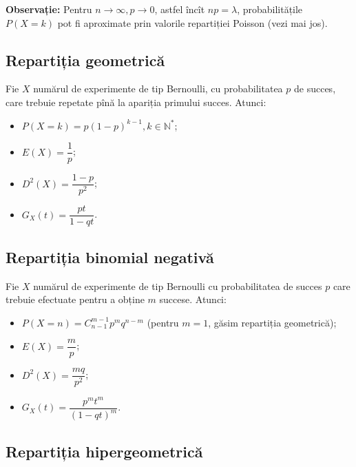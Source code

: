 \documentclass[12pt,a4paper]{article}
\newcommand\NN{\mathbb{N}}
\theoremstyle{dotless}
\theoremstyle{dotlessdr}
\begin{document}
\textbf{Observație:} Pentru $ n \to \infty, p \to 0 $, astfel încît $ np = \lambda $,
probabilitățile $ P(X = k) $ pot fi aproximate prin valorile repartiției Poisson
(vezi mai jos).


\subsection*{Repartiția geometrică}

\indent\indent Fie $ X $ numărul de experimente de tip Bernoulli, cu probabilitatea $ p $
de succes, care trebuie repetate pînă la apariția primului succes. Atunci:
\begin{itemize}
\item $ P(X = k) = p(1 - p)^{k - 1}, k \in \NN^\ast $;
\item $ E(X) = \dfrac{1}{p} $;
\item $ D^2(X) = \dfrac{1 - p}{p^2} $;
\item $ G_X(t) = \dfrac{pt}{1 - qt} $.
\end{itemize}


\subsection*{Repartiția binomial negativă}

\indent\indent Fie $ X $ numărul de experimente de tip Bernoulli cu probabilitatea
de succes $ p $ care trebuie efectuate pentru a obține $ m $ succese. Atunci:
\begin{itemize}
\item $ P(X = n) = C_{n-1}^{m - 1} p^m q^{n-m} $ (pentru $ m = 1 $, găsim repartiția
  geometrică);
\item $ E(X) = \dfrac{m}{p} $;
\item $ D^2(X) = \dfrac{mq}{p^2} $;
\item $ G_X(t) = \dfrac{p^m t^m}{(1 - qt)^m} $.
\end{itemize}


\subsection*{Repartiția hipergeometrică}
\end{document}
